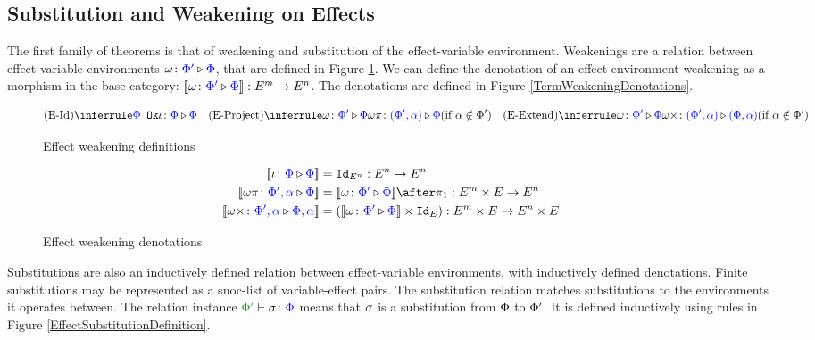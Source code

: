 \documentclass{Report}
\begin{document}
\subsection{Substitution and Weakening on Effects}\label{SectionEffectSubstitution}

The first family of theorems is that of weakening and substitution of the effect-variable environment. Weakenings are a relation between effect-variable environments $\wrel{\w}{\P'}{\P}$, that are defined in Figure \ref{EffectWeakeningDefinition}. We can define the denotation of an effect-environment weakening as a morphism in the base category: $\deno{\wrelw{\P'}{\P}}: E^m \rightarrow E^n$. The denotations are defined in Figure \ref{TermWeakeningDenotations}.

\begin{figure}[H]
    \centering
    \begin{framed}
        \[
    \ntreeruleI{\eid}{\ok{\P}}{\wrel{\i}{\P}{\P}}
    \quad
    \condtreeruleI{\eproject}{\wrel{\w}{\P'}{\P}}{\wrel{\w\pi}{(\P', \a)}{\P}}{\a\notin\P'}
    \quad
    \condtreeruleI{\eextend}{\wrel{\w}{\P'}{\P}}{\wrel{\w\x}{(\P', \a)}{(\P, \a)}}{\a\notin\P'}
\]
    \end{framed}
    \caption{Effect weakening definitions}
    \label{EffectWeakeningDefinition}
\end{figure}


\begin{figure}[H]
    \centering
    \begin{framed}
        \begin{align*}
            \deno{\wrel{\i}{\P}{\P}} & = \Id{E^n}: E^n \rightarrow E^n
            \\
            \deno{\wrel{\w\pi}{\P',\a}{\P}} & = \deno{\wrelw{\P'}{\P}}\after \p: E^m\times E\rightarrow E^n
            \\
            \deno{\wrel{\w\x}{\P',\a}{\P,\a}} & = (\deno{\wrelw{\P'}{\P}}\times \Id{E}): E^m\times E\rightarrow E^n\times E 
        \end{align*}
    \end{framed}
    \caption{Effect weakening denotations}
    \label{EffectWeakeningDenotations}
\end{figure}

Substitutions are also an inductively defined relation between effect-variable environments, with inductively defined denotations. Finite substitutions may be represented as a snoc-list of variable-effect pairs. The substitution relation matches substitutions to the environments it operates between. The relation instance $\typerelation{\P'}{\si}{\P}$ means that $\si$ is a substitution from $\P$ to $\P'$. It is defined inductively using rules in Figure \ref{EffectSubstitutionDefinition}.
\end{document}
